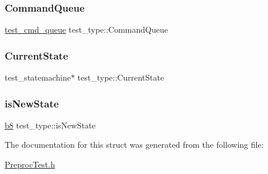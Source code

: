 \subsubsection{\texorpdfstring{Command\+Queue}{CommandQueue}}
{\footnotesize\ttfamily \hyperlink{structtest__cmd__queue}{test\+\_\+cmd\+\_\+queue} test\+\_\+type\+::\+Command\+Queue}

\mbox{\label{structtest__type_a48139457e16e23a57531e5af02be7f14}} 
\subsubsection{\texorpdfstring{Current\+State}{CurrentState}}
{\footnotesize\ttfamily test\+\_\+statemachine$\ast$ test\+\_\+type\+::\+Current\+State}

\mbox{\label{structtest__type_a36eb3041ef1341aec27a2a2d98500ce6}} 
\subsubsection{\texorpdfstring{is\+New\+State}{isNewState}}
{\footnotesize\ttfamily \hyperlink{ab__common_8h_a70e369648385b50f2d0588e8e8745275}{b8} test\+\_\+type\+::is\+New\+State}



The documentation for this struct was generated from the following file\+:\begin{DoxyCompactItemize}
\item 
\hyperlink{PreprocTest_8h}{Preproc\+Test.\+h}\end{DoxyCompactItemize}
